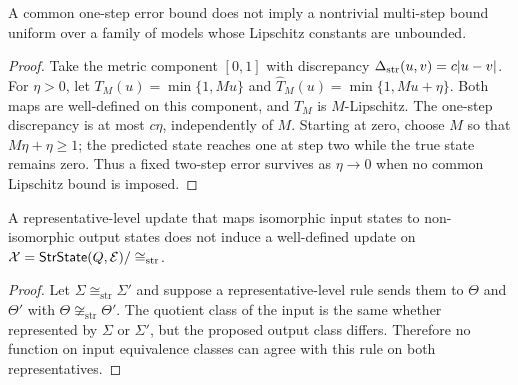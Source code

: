 \begin{proposition}
A common one-step error bound does not imply a nontrivial multi-step bound
uniform over a family of models whose Lipschitz constants are unbounded.
\end{proposition}

\begin{proof}
Take the metric component $[0,1]$ with discrepancy
$\Delta_{\mathrm{str}}(u,v)=c|u-v|$. For $\eta>0$, let
$T_M(u)=\min\{1,Mu\}$ and $\widehat T_M(u)=\min\{1,Mu+\eta\}$.
Both maps are well-defined on this component, and $T_M$ is $M$-Lipschitz.
The one-step discrepancy is at most $c\eta$, independently of $M$. Starting
at zero, choose $M$ so that $M\eta+\eta\geq1$; the predicted state reaches one
at step two while the true state remains zero. Thus a fixed two-step error
survives as $\eta\to0$ when no common Lipschitz bound is imposed.
\end{proof}

\begin{proposition}
A representative-level update that maps isomorphic input states to
non-isomorphic output states does not induce a well-defined update on
$\mathcal X=\mathsf{StrState}(Q,\mathcal E)/\cong_{\mathrm{str}}$.
\end{proposition}

\begin{proof}
Let $\Sigma\cong_{\mathrm{str}}\Sigma'$ and suppose a representative-level rule
sends them to $\Theta$ and $\Theta'$ with
$\Theta\not\cong_{\mathrm{str}}\Theta'$. The quotient class of the input is the
same whether represented by $\Sigma$ or $\Sigma'$, but the proposed output
class differs. Therefore no function on input equivalence classes can agree
with this rule on both representatives.
\end{proof}
